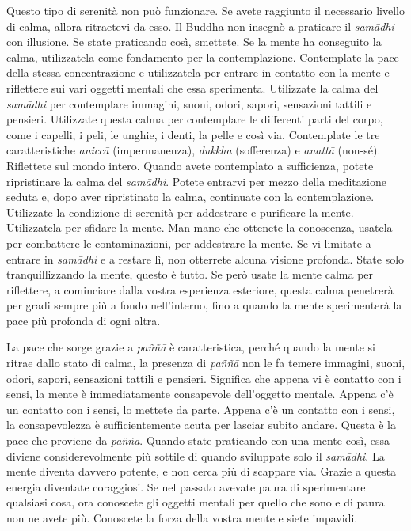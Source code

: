 Questo tipo di serenità non può funzionare. Se avete raggiunto il
necessario livello di calma, allora ritraetevi da esso. Il Buddha non
insegnò a praticare il \emph{samādhi} con illusione. Se state praticando
così, smettete. Se la mente ha conseguito la calma, utilizzatela come
fondamento per la contemplazione. Contemplate la pace della stessa
concentrazione e utilizzatela per entrare in contatto con la mente e
riflettere sui vari oggetti mentali che essa sperimenta. Utilizzate la
calma del \emph{samādhi} per contemplare immagini, suoni, odori, sapori,
sensazioni tattili e pensieri. Utilizzate questa calma per contemplare
le differenti parti del corpo, come i capelli, i peli, le unghie, i
denti, la pelle e così via. Contemplate le tre caratteristiche
\emph{aniccā} (impermanenza), \emph{dukkha} (sofferenza) e \emph{anattā}
(non-sé). Riflettete sul mondo intero. Quando avete contemplato a
sufficienza, potete ripristinare la calma del \emph{samādhi}. Potete
entrarvi per mezzo della meditazione seduta e, dopo aver ripristinato la
calma, continuate con la contemplazione. Utilizzate la condizione di
serenità per addestrare e purificare la mente. Utilizzatela per sfidare
la mente. Man mano che ottenete la conoscenza, usatela per combattere le
contaminazioni, per addestrare la mente. Se vi limitate a entrare in
\emph{samādhi} e a restare lì, non otterrete alcuna visione profonda.
State solo tranquillizzando la mente, questo è tutto. Se però usate la
mente calma per riflettere, a cominciare dalla vostra esperienza
esteriore, questa calma penetrerà per gradi sempre più a fondo
nell'interno, fino a quando la mente sperimenterà la pace più profonda
di ogni altra.

La pace che sorge grazie a \emph{paññā} è caratteristica, perché quando
la mente si ritrae dallo stato di calma, la presenza di \emph{paññā} non
le fa temere immagini, suoni, odori, sapori, sensazioni tattili e
pensieri. Significa che appena vi è contatto con i sensi, la mente è
immediatamente consapevole dell'oggetto mentale. Appena c'è un contatto
con i sensi, lo mettete da parte. Appena c'è un contatto con i sensi, la
consapevolezza è sufficientemente acuta per lasciar subito andare.
Questa è la pace che proviene da \emph{paññā}. Quando state praticando
con una mente così, essa diviene considerevolmente più sottile di quando
sviluppate solo il \emph{samādhi}. La mente diventa davvero potente, e
non cerca più di scappare via. Grazie a questa energia diventate
coraggiosi. Se nel passato avevate paura di sperimentare qualsiasi cosa,
ora conoscete gli oggetti mentali per quello che sono e di paura non ne
avete più. Conoscete la forza della vostra mente e siete impavidi.

